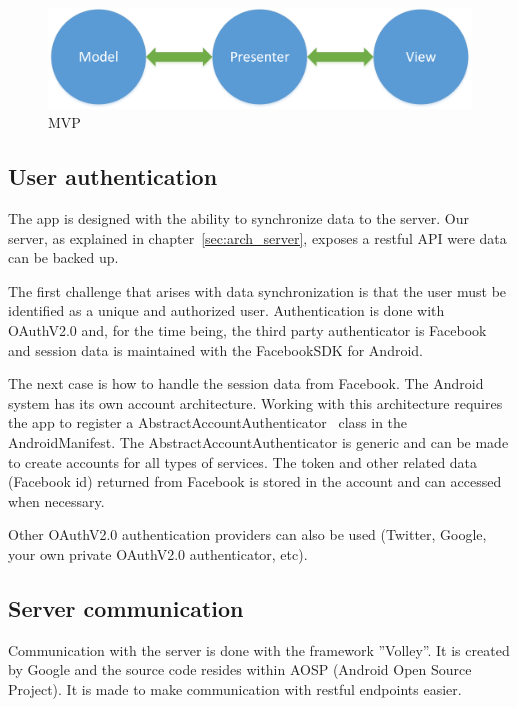 \begin{figure}[H]
\includegraphics[width=\textwidth]{ch/architecture/fig/mvp.png}
\caption{MVP}
\label{fig:mvp}
\end{figure}

\subsection{User authentication}
The app is designed with the ability to synchronize data to the server. Our server, as explained in chapter~\ref{sec:arch_server}, exposes a restful API were data can be backed up.

The first challenge that arises with data synchronization is that the user must be identified as a unique and authorized user. Authentication is done with OAuthV2.0 and, for the time being, the third party authenticator is Facebook and session data is maintained with the FacebookSDK for Android. 

The next case is how to handle the session data from Facebook. The Android system has its own account architecture. Working with this architecture requires the app to register a AbstractAccountAuthenticator~\cite{androidAccount} class in the AndroidManifest. The AbstractAccountAuthenticator is generic and can be made to create accounts for all types of services. The token and other related data (Facebook id) returned from Facebook is stored in the account and can accessed when necessary.

Other OAuthV2.0 authentication providers can also be used (Twitter, Google, your own private OAuthV2.0 authenticator, etc). 


\subsection{Server communication}
Communication with the server is done with the framework ''Volley''. It is created by Google and the source code resides within AOSP (Android Open Source Project). It is made to make communication with restful endpoints easier.

